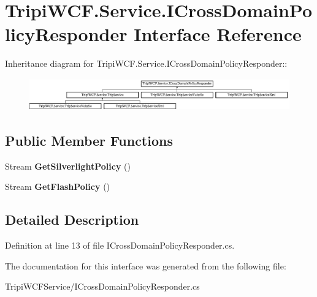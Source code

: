 \hypertarget{interface_tripi_w_c_f_1_1_service_1_1_i_cross_domain_policy_responder}{
\section{TripiWCF.Service.ICrossDomainPolicyResponder Interface Reference}
\label{interface_tripi_w_c_f_1_1_service_1_1_i_cross_domain_policy_responder}
}
Inheritance diagram for TripiWCF.Service.ICrossDomainPolicyResponder::\begin{figure}[H]
\begin{center}
\leavevmode
\includegraphics[height=1.40468cm]{interface_tripi_w_c_f_1_1_service_1_1_i_cross_domain_policy_responder}
\end{center}
\end{figure}
\subsection*{Public Member Functions}
\begin{DoxyCompactItemize}
\item 
\hypertarget{interface_tripi_w_c_f_1_1_service_1_1_i_cross_domain_policy_responder_aa4010ea696fa121d40b3aa9dfd4102b1}{
Stream {\bfseries GetSilverlightPolicy} ()}
\label{interface_tripi_w_c_f_1_1_service_1_1_i_cross_domain_policy_responder_aa4010ea696fa121d40b3aa9dfd4102b1}

\item 
\hypertarget{interface_tripi_w_c_f_1_1_service_1_1_i_cross_domain_policy_responder_ac966ff4ebb79635284f4296543f22d10}{
Stream {\bfseries GetFlashPolicy} ()}
\label{interface_tripi_w_c_f_1_1_service_1_1_i_cross_domain_policy_responder_ac966ff4ebb79635284f4296543f22d10}

\end{DoxyCompactItemize}


\subsection{Detailed Description}


Definition at line 13 of file ICrossDomainPolicyResponder.cs.

The documentation for this interface was generated from the following file:\begin{DoxyCompactItemize}
\item 
TripiWCFService/ICrossDomainPolicyResponder.cs\end{DoxyCompactItemize}
